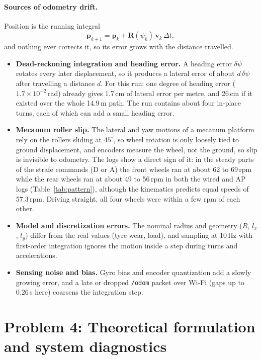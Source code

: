 \documentclass[11pt,a4paper]{article}
\begin{document}
\paragraph{Sources of odometry drift.} Position is the running integral
\[
\mathbf p_{k+1}=\mathbf p_k+\mathbf R(\psi_k)\,\mathbf v_k\,\Delta t,
\]
and nothing ever corrects it, so its error grows with the distance travelled.
\begin{itemize}
  \item \textbf{Dead-reckoning integration and heading error.} A heading error $\delta\psi$ rotates every later displacement, so it produces a lateral error of about $d\,\delta\psi$ after travelling a distance $d$. For this run: one degree of heading error ($1.7\times10^{-2}$\,rad) already gives 1.7\,cm of lateral error per metre, and 26\,cm if it existed over the whole 14.9\,m path. The run contains about four in-place turns, each of which can add a small heading error.
  \item \textbf{Mecanum roller slip.} The lateral and yaw motions of a mecanum platform rely on the rollers sliding at $45^\circ$, so wheel rotation is only loosely tied to ground displacement, and encoders measure the wheel, not the ground, so slip is invisible to odometry. The logs show a direct sign of it: in the steady parts of the strafe commands (D or A) the front wheels ran at about 62 to 69\,rpm while the rear wheels ran at about 49 to 56\,rpm in both the wired and AP logs (Table~\ref{tab:pattern}), although the kinematics predicts equal speeds of 57.3\,rpm. Driving straight, all four wheels were within a few rpm of each other.
  \item \textbf{Model and discretization errors.} The nominal radius and geometry ($R$, $l_x$, $l_y$) differ from the real values (tyre wear, load), and sampling at 10\,Hz with first-order integration ignores the motion inside a step during turns and accelerations.
  \item \textbf{Sensing noise and bias.} Gyro bias and encoder quantization add a slowly growing error, and a late or dropped \texttt{/odom} packet over Wi-Fi (gaps up to 0.26\,s here) coarsens the integration step.
\end{itemize}

\section{Problem 4: Theoretical formulation and system diagnostics}
\end{document}
